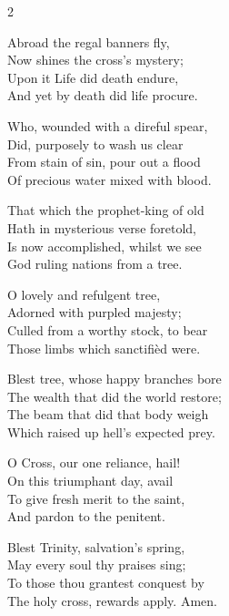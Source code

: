 \begin{multicols}{2}
\raggedcolumns
\begin{enpars}
Abroad the regal banners fly,\\
Now shines the cross’s mystery;\\
Upon it Life did death endure,\\
And yet by death did life procure.

Who, wounded with a direful spear,\\
Did, purposely to wash us clear\\
From stain of sin, pour out a flood\\
Of precious water mixed with blood.

That which the prophet-king of old\\
Hath in mysterious verse foretold,\\
Is now accomplished, whilst we see\\
God ruling nations from a tree.

O lovely and refulgent tree,\\
Adorned with purpled majesty;\\
Culled from a worthy stock, to bear\\
Those limbs which sanctifièd were.

Blest tree, whose happy branches bore\\
The wealth that did the world restore;\\
The beam that did that body weigh\\
Which raised up hell’s expected prey.

O Cross, our one reliance, hail!\\
On this triumphant day, avail\\
To give fresh merit to the saint,\\
And pardon to the penitent.

Blest Trinity, salvation’s spring,\\
May every soul thy praises sing;\\
To those thou grantest conquest by\\
The holy cross, rewards apply. Amen.
\end{enpars}\end{multicols}